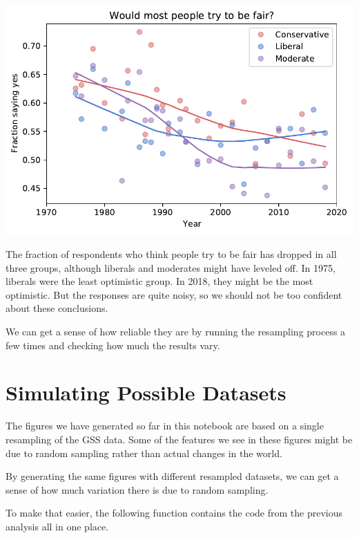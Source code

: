 \begin{center}
\includegraphics[scale=0.75]{chapters/03_outlook_files/03_outlook_55_0.pdf}
\end{center}

The fraction of respondents who think people try to be fair has dropped
in all three groups, although liberals and moderates might have leveled
off. In 1975, liberals were the least optimistic group. In 2018, they
might be the most optimistic. But the responses are quite noisy, so we
should not be too confident about these conclusions.

We can get a sense of how reliable they are by running the resampling
process a few times and checking how much the results vary.

\hypertarget{simulating-possible-datasets}{%
\section{Simulating Possible
Datasets}\label{simulating-possible-datasets}}

The figures we have generated so far in this notebook are based on a
single resampling of the GSS data. Some of the features we see in these
figures might be due to random sampling rather than actual changes in
the world.

By generating the same figures with different resampled datasets, we can
get a sense of how much variation there is due to random sampling.

To make that easier, the following function contains the code from the
previous analysis all in one place.

